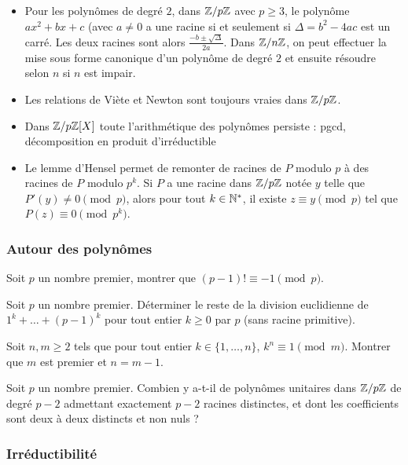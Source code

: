 \begin{itemize}
\item Pour les polynômes de degré $2$, dans $\mathbb Z/p\mathbb Z$ avec $p\geq 3$, le polynôme $ax^2 + bx + c$ (avec $a\neq 0$ a une racine si et seulement si $\Delta=b^2 - 4ac$ est un carré. Les deux racines sont alors $\frac{-b\pm\sqrt{\Delta}}{2a}$. Dans $\mathbb Z/n\mathbb Z$, on peut effectuer la mise sous forme canonique d'un polynôme de degré $2$ et ensuite résoudre selon $n$ si $n$ est impair.

\item Les relations de Viète et Newton sont toujours vraies dans $\mathbb Z/p\mathbb Z$.
\item Dans $\mathbb Z/p\mathbb Z[X]$ toute l'arithmétique des polynômes persiste : pgcd, décomposition en produit d'irréductible

\item Le lemme d'Hensel permet de remonter de racines de $P$ modulo $p$ à des racines de $P$ modulo $p^k$. Si $P$ a une racine dans $\mathbb Z/p\mathbb Z$ notée $y$ telle que $P'(y)\neq 0 \pmod{p}$, alors pour tout $k\in \mathbb N^*$, il existe $z\equiv y\pmod{p}$ tel que $P(z)\equiv 0 \pmod{p^k}$.
\end{itemize}


\subsubsection{Autour des polynômes}

\begin{exo}
Soit $p$ un nombre premier, montrer que $(p - 1)!\equiv -1\pmod{p}$.
\end{exo}

\begin{exo}
Soit $p$ un nombre premier. Déterminer le reste de la division euclidienne de $1^k + \dots + (p - 1)^k$ pour tout entier $k\geq 0$  par $p$ (sans racine primitive).
\end{exo}

\begin{exo}
Soit $n,m\geq 2$ tels que pour tout entier $k\in \{1,\dots, n\}$, $k^n\equiv 1\pmod{m}$. Montrer que $m$ est premier et $n=m - 1$.
\end{exo}

\begin{exo}
Soit $p$ un nombre premier. Combien y a-t-il de polynômes unitaires dans $\mathbb Z/ p\mathbb Z$ de degré $p - 2$ admettant exactement $p - 2$ racines distinctes, et dont les coefficients sont deux à deux distincts et non nuls ?
\end{exo}


\subsubsection{Irréductibilité}


